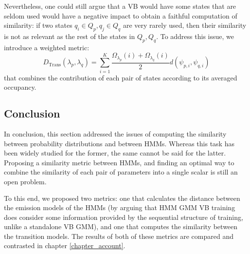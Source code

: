 \documentclass[../main.tex]{subfiles}
\begin{document}
\par Nevertheless, one could still argue that a VB would have some states that are seldom used would have a negative impact to obtain a faithful computation of similarity: if two states $q_i \in Q_p, q_j \in Q_q$ are very rarely used, then their similarity is not as relevant as the rest of the states in $Q_p, Q_q$. To address this issue, we introduce a weighted metric:
\begin{equation} \label{eq:hmmdist}
D_{\text{Trans}}(\lambda_p, \lambda_q) = \sum_{i=1}^K \frac{\Omega_{\lambda_p}(i) + \Omega_{\lambda_q}(i)}{2} d(\psi_{p, i}, \psi_{q, i})
\end{equation}
that combines the contribution of each pair of states according to its averaged occupancy.
\subsection{Conclusion}
In conclusion, this section addressed the issues of computing the similarity between probability distributions and between HMMs. Whereas this task has been widely studied for the former, the same cannot be said for the latter. Proposing a similarity metric between HMMs, and finding an optimal way to combine the similarity of each pair of parameters into a single scalar is still an open problem. 
\par To this end, we proposed two metrics: one that calculates the distance between the emission models of the HMMs (by arguing that HMM GMM VB training does consider some information provided by the sequential structure of training, unlike a standalone VB GMM), and one that computes the similarity between the transition models. The results of both of these metrics are compared and contrasted in chapter \ref{chapter_account}.
\end{document}
